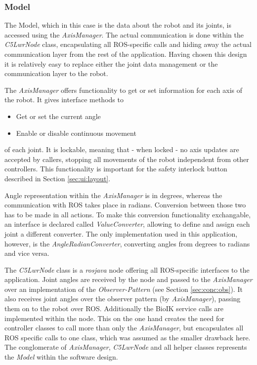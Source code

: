 \subsubsection{Model}

The Model, which in this case is the data about the robot and its joints, is accessed using the \textit{AxisManager}. The actual communication is done within the \textit{C5LwrNode} class, encapsulating all ROS-specific calls and hiding away the actual communication layer from the rest of the application. Having chosen this design it is relatively easy to replace either the joint data management or the communication layer to the robot.

The \textit{AxisManager} offers functionality to get or set information for each axis of the robot. It gives interface methods to
\begin{itemize}
	\item Get or set the current angle
	\item Enable or disable continuous movement
\end{itemize}
of each joint. It is lockable, meaning that - when locked - no axis updates are accepted by callers, stopping all movements of the robot independent from other controllers. This functionality is important for the safety interlock button described in Section \ref{sec:ui:layout}.

Angle representation within the \textit{AxisManager} is in degrees, whereas the communication with ROS takes place in radians. Conversion between those two has to be made in all actions. To make this conversion functionality exchangable, an interface is declared called \textit{ValueConverter}, allowing to define and assign each joint a different converter. The only implementation used in this application, however, is the \textit{AngleRadianConverter}, converting angles from degrees to radians and vice versa.

The \textit{C5LwrNode} class is a \textit{rosjava} node offering all ROS-specific interfaces to the application. Joint angles are received by the node and passed to the \textit{AxisManager} over an implementation of the \textit{Observer-Pattern} (see Section \ref{sec:conc:obs}). It also receives joint angles over the observer pattern (by \textit{AxisManager}), passing them on to the robot over ROS. Additionally the BioIK service calls are implemented within the node. This on the one hand creates the need for controller classes to call more than only the \textit{AxisManager}, but encapsulates all ROS specific calls to one class, which was assumed as the smaller drawback here. The conglomerate of \textit{AxisManager}, \textit{C5LwrNode} and all helper classes represents the \textit{Model} within the software design.

